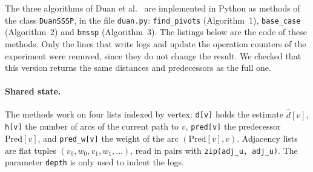 

The three algorithms of Duan et al.~\cite{duan2025} are implemented in Python as methods of
the class \texttt{DuanSSSP}, in the file \texttt{duan.py}: \texttt{find\_pivots}
(Algorithm~1), \texttt{base\_case} (Algorithm~2) and \texttt{bmssp} (Algorithm~3). The
listings below are the code of these methods. Only the lines that write logs and update the
operation counters of the experiment were removed, since they do not change the result. We
checked that this version returns the same distances and predecessors as the full one.

\paragraph{Shared state.} The methods work on four lists indexed by vertex:
\texttt{d[v]} holds the estimate $\hat{d}[v]$, \texttt{h[v]} the number of arcs of the
current path to $v$, \texttt{pred[v]} the predecessor $\mathrm{Pred}[v]$, and
\texttt{pred\_w[v]} the weight of the arc $(\mathrm{Pred}[v], v)$. Adjacency lists are flat
tuples $(v_0, w_0, v_1, w_1, \dots)$, read in pairs with \texttt{zip(adj\_u, adj\_u)}. The
parameter \texttt{depth} is only used to indent the logs.


